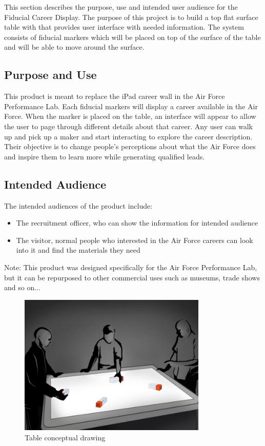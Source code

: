 This section describes the purpose, use and intended user audience for the Fiducial Career Display.
The purpose of this  project is to build a top flat surface table with that  provides user
interface with needed information. The system consists of fiducial markers which will be placed on
top of the surface of the table and will be able to move around the surface.

\subsection{Purpose and Use}
This product is meant to replace the iPad career wall in the Air Force Performance Lab.
Each fiducial markers will display a career available in the Air Force.
When the marker is placed on the table, an interface will appear to allow the user to page through different details about that career.
Any user can walk up and pick up a maker and start interacting to explore the career description.
Their objective is to change people's perceptions about what the Air Force does and inspire them to learn more while
generating qualified leads.

\subsection{Intended Audience}
The intended audiences of the product include:
\begin{itemize}
\item The recruitment officer, who can show the information for intended audience
\item The visitor, normal people who interested in the Air Force careers can look into it and find the materials they need
\end{itemize}


Note: This product was designed specifically for the Air Force Performance Lab, but it can be repurposed to other commercial uses such as museums, trade shows and so on...
\begin{figure}[h!]
	\centering
   	\includegraphics[width=0.8\textwidth]{images/Concept_Sketches_03}
    \caption{Table conceptual drawing \cite{concept1}}
\end{figure}

